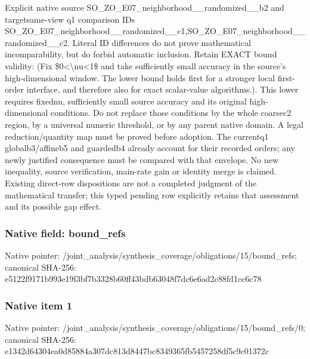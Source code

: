 \documentclass[10pt,a4paper]{article}
\begin{document}
\begingroup\raggedright\sloppy Explicit native source SO\_\allowbreak{}ZO\_\allowbreak{}E07\_\allowbreak{}neighborhood\_\allowbreak{}\_\allowbreak{}randomized\_\allowbreak{}\_\allowbreak{}b2 and targetsame-view q1 comparison IDs SO\_\allowbreak{}ZO\_\allowbreak{}E07\_\allowbreak{}neighborhood\_\allowbreak{}\_\allowbreak{}randomized\_\allowbreak{}\_\allowbreak{}c1,\allowbreak{}SO\_\allowbreak{}ZO\_\allowbreak{}E07\_\allowbreak{}neighborhood\_\allowbreak{}\_\allowbreak{}randomized\_\allowbreak{}\_\allowbreak{}c2. Literal ID differences do not prove mathematical incomparability,\allowbreak{} but do forbid automatic inclusion. Retain EXACT bound validity:\allowbreak{} (Fix \$0<\textbackslash{}nu<1\$ and take sufficiently small accuracy in the source's high-dimensional window. The lower bound holds first for a stronger local first-order interface,\allowbreak{} and therefore also for exact scalar-value algorithms.). This lower requires fixednu,\allowbreak{} sufficiently small source accuracy and its original high-dimensional conditions. Do not replace those conditions by the whole coarsec2 region,\allowbreak{} by a universal numeric threshold,\allowbreak{} or by any parent native domain. A legal reduction/\allowbreak{}quantity map must be proved before adoption. The currentq1 globalb3/\allowbreak{}affineb5 and guardedb4 already account for their recorded orders;\allowbreak{} any newly justified consequence must be compared with that envelope. No new inequality,\allowbreak{} source verification,\allowbreak{} main-rate gain or identity merge is claimed. Existing direct-row dispositions are not a completed judgment of the mathematical transfer;\allowbreak{} this typed pending row explicitly retains that assessment and its possible gap effect.\par\endgroup

\subsubsection{Native field: bound\_\allowbreak{}refs}
Native pointer: /joint\_\allowbreak{}analysis/synthesis\_\allowbreak{}coverage/obligations/15/bound\_\allowbreak{}refs; canonical SHA-256: e5122f9171b993e19f3bf7b3328b60ff43bdb63048f7dc6e6ad2c88fd1cc6c78

\subsubsection{Native item 1}
Native pointer: /joint\_\allowbreak{}analysis/synthesis\_\allowbreak{}coverage/obligations/15/bound\_\allowbreak{}refs/0; canonical SHA-256: e1342d64304ea0d85884a307dc813d8447bc8349365fb5457258df5c9c01372c
\end{document}
